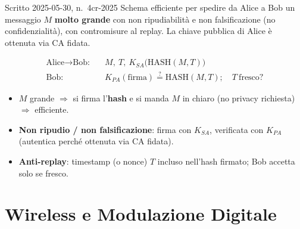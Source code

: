 \documentclass{report}
\newcommand{\Ks}[1]{K_{S#1}}   %
\newcommand{\Kp}[1]{K_{P#1}}   %
\newcommand{\HASH}{\text{HASH}}
\begin{document}
\begin{Exercise}{Scritto 2025-05-30, n.\ 4}{cr-2025}
Schema efficiente per spedire da Alice a Bob un messaggio $M$ \textbf{molto
grande} con non ripudiabilità e non falsificazione (no confidenzialità), con
contromisure al replay. La chiave pubblica di Alice è ottenuta via CA fidata.
\end{Exercise}

\begin{solution}
\begin{align*}
\text{Alice}\to\text{Bob:}\quad & M,\ T,\ \Ks{A}\big(\HASH(M,T)\big)\\
\text{Bob:}\quad & \Kp{A}(\text{firma})\overset{?}{=}\HASH(M,T);\quad T\ \text{fresco?}
\end{align*}
\begin{itemize}
\item $M$ grande $\Rightarrow$ si firma l'\textbf{hash} e si manda $M$ in chiaro
(no privacy richiesta) $\Rightarrow$ efficiente.
\item \textbf{Non ripudio / non falsificazione}: firma con $\Ks{A}$, verificata
con $\Kp{A}$ (autentica perché ottenuta via CA fidata).
\item \textbf{Anti-replay}: timestamp (o nonce) $T$ incluso nell'hash firmato;
Bob accetta solo se fresco.
\end{itemize}
\end{solution}


\chapter{Wireless e Modulazione Digitale}

\end{document}
